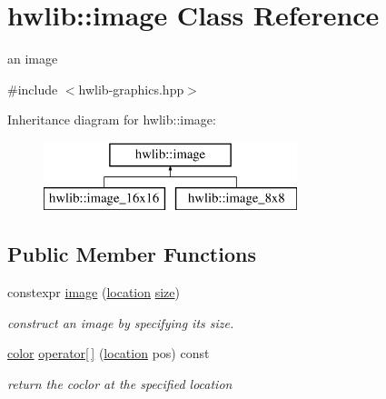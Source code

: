 \hypertarget{classhwlib_1_1image}{}\section{hwlib\+:\+:image Class Reference}
\label{classhwlib_1_1image}


an image  




{\ttfamily \#include $<$hwlib-\/graphics.\+hpp$>$}

Inheritance diagram for hwlib\+:\+:image\+:\begin{figure}[H]
\begin{center}
\leavevmode
\includegraphics[height=2.000000cm]{classhwlib_1_1image}
\end{center}
\end{figure}
\subsection*{Public Member Functions}
\begin{DoxyCompactItemize}
\item 
constexpr \hyperlink{classhwlib_1_1image_a0546f83e7d9ffa8de211d64925a24d3f}{image} (\hyperlink{classhwlib_1_1location}{location} \hyperlink{classhwlib_1_1image_ab675f56d00632a4099ed9ec1d4539165}{size})\hypertarget{classhwlib_1_1image_a0546f83e7d9ffa8de211d64925a24d3f}{}\label{classhwlib_1_1image_a0546f83e7d9ffa8de211d64925a24d3f}

\begin{DoxyCompactList}\small\item\em construct an image by specifying its size. \end{DoxyCompactList}\item 
\hyperlink{classhwlib_1_1color}{color} \hyperlink{classhwlib_1_1image_acfdcdfcfe6b0902b5428b4c5aaf37671}{operator\mbox{[}$\,$\mbox{]}} (\hyperlink{classhwlib_1_1location}{location} pos) const \hypertarget{classhwlib_1_1image_acfdcdfcfe6b0902b5428b4c5aaf37671}{}\label{classhwlib_1_1image_acfdcdfcfe6b0902b5428b4c5aaf37671}

\begin{DoxyCompactList}\small\item\em return the coclor at the specified location \end{DoxyCompactList}\end{DoxyCompactItemize}

